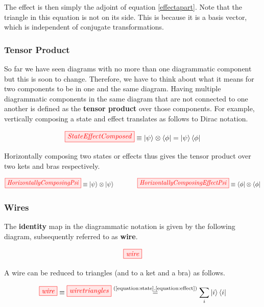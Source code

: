 \documentclass[]{article}
\newcommand{\equaltext}[1]{\ensuremath{\stackrel{\text{#1}}{=}}}
\begin{document}
The effect is then simply the adjoint of equation \ref{effectapart}. Note that the triangle in this equation is not on its side. This is because it is a basis vector, which is independent of conjugate transformations. 

\subsubsection{Tensor Product}
\label{section:tensorproduct}
So far we have seen diagrams with no more than one diagrammatic component but this is soon to change. Therefore, we have to think about what it means for two components to be in one and the same diagram. Having multiple diagrammatic components in the same diagram that are not connected to one another is defined as the \textbf{tensor product} over those components. For example, vertically composing a state and effect translates as follows to Dirac notation.

\begin{equation}
	\tikzfig{StateEffectComposed} \equiv \ket{\psi}\otimes\bra{\phi} = \ket{\psi}\bra{\phi}
\end{equation}

Horizontally composing two states or effects thus gives the tensor product over two kets and bras respectively.

\begin{equation}
	\tikzfig{HorizontallyComposingPsi} \equiv \ket{\psi} \otimes \ket{\psi} ~~~~~~~~~~~ \tikzfig{HorizontallyComposingEffectPsi} \equiv \bra{\phi} \otimes \bra{\phi}
\end{equation}

\subsubsection{Wires}
\label{identity}
The \textbf{identity} map in the diagrammatic notation is given by the following diagram, subsequently referred to as \textbf{wire}.

\begin{equation}
\tikzfig{wire}
\end{equation}

A wire can be reduced to triangles (and to a ket and a bra) as follows.

\begin{equation}
\label{equation:wiredecomposed}
\tikzfig{wire} \equiv \tikzfig{wiretriangles} \equaltext{(\ref{equation:state},\ref{equation:effect})} \sum_{i}\ket{i}\bra{i}
\end{equation}
\end{document}
